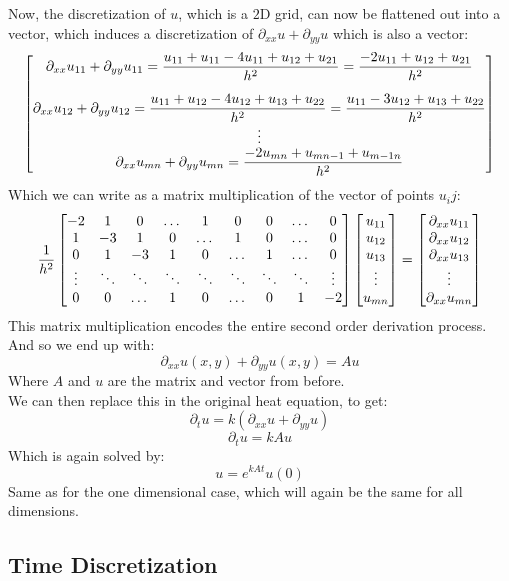 \documentclass[12pt]{article}
\begin{document}
Now, the discretization of $u$, which is a $2$D
grid, can now be flattened out into a vector,
which induces a discretization of
$\partial_{xx} u + \partial_{yy} u$
which is also a vector:
\[ \bmat{
    \partial_{xx} u_{11} + \partial_{yy} u_{11} 
    = \dfrac{u_{11} + u_{11} - 4u_{11} + u_{12} 
    + u_{21}}{h^2} = 
    \dfrac{-2u_{11} + u_{12} + u_{21}}{h^2}  \vs{10} \\
    \partial_{xx} u_{12} + \partial_{yy} u_{12} 
    = \dfrac{u_{11} + u_{12} - 4u_{12} + u_{13} 
    + u_{22}}{h^2} = 
    \dfrac{u_{11} - 3u_{12} + u_{13} + u_{22}}{h^2} \\
    \vdots \\
    \partial_{xx} u_{mn} + \partial_{yy} u_{mn} 
    = \dfrac{- 2u_{mn} + u_{mn-1} + u_{m-1n}}{h^2}}
\]
Which we can write as a matrix multiplication
of the vector of points $u_ij$:
\[ \dfrac{1}{h^2}
\begin{bmatrix} -2 & 1 & 0 & \dots & 1 & 0 & 0 & \dots & 0 \\
1 & -3 & 1 & 0 & \dots & 1 & 0 & \dots & 0 \\
0 & 1 & -3 & 1 & 0 & \dots & 1 & \dots & 0 \\
\vdots & \ddots & \ddots & \ddots & \ddots 
& \ddots & \ddots & \ddots & \vdots \\
0 & 0 & \dots & 1 & 0 & \dots & 0 & 1 & -2  \end{bmatrix}
\begin{bmatrix} u_{11} \\ u_{12} \\ u_{13} \\ \vdots \\ u_{mn} \end{bmatrix}
= \begin{bmatrix} \partial_{xx} u_{11} \\ \partial_{xx} u_{12} \\
\partial_{xx} u_{13} \\ \vdots \\ \partial_{xx} u_{mn} \end{bmatrix} \]
This matrix multiplication encodes the entire
second order derivation process. \\

And so we end up with:
\[ \partial_{xx} u(x, y) + \partial_{yy} u(x, y) = Au \]
Where $A$ and $u$
are the matrix and vector from before. \\
We can then replace this in the original heat
equation, to get:
\[\partial_t u = k (\partial_{xx} u + \partial_{yy} u) \]
\[ \partial_t u = kAu \]
Which is again solved by:
\[ u = e^{kAt}u(0) \]
Same as for the one dimensional case, 
which will again be the same for all dimensions. \\

\newpage

\subsection*{Time Discretization}
\end{document}
